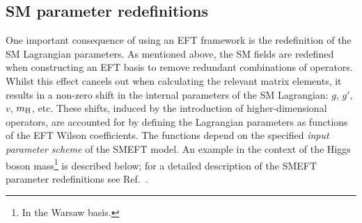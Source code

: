 \subsection{SM parameter redefinitions}
One important consequence of using an EFT framework is the redefinition of the SM Lagrangian parameters. As mentioned above, the SM fields are redefined when constructing an EFT basis to remove redundant combinations of operators. Whilst this effect cancels out when calculating the relevant matrix elements, it results in a non-zero shift in the internal parameters of the SM Lagrangian: $g$, $g'$, $v$, $m_{\rm{H}}$, etc. These shifts, induced by the introduction of higher-dimensional operators, are accounted for by defining the Lagrangian parameters as functions of the EFT Wilson coefficients. The functions depend on the specified \textit{input parameter scheme} of the SMEFT model. An example in the context of the Higgs boson mass\footnote{In the Warsaw basis.} is described below; for a detailed description of the SMEFT parameter redefinitions see Ref.~\cite{Brivio:2017btx}.

